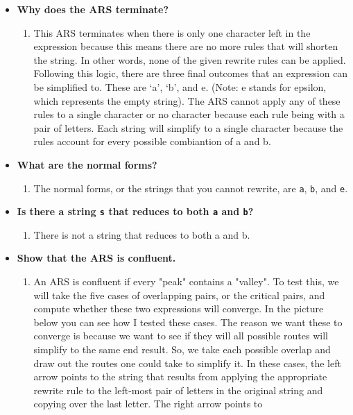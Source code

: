 \documentclass{article}
\theoremstyle{theorem}
\theoremstyle{definition}
\theoremstyle{remark}
\begin{document}
\begin{itemize}
  \item \textbf{Why does the ARS terminate?}
    \begin{enumerate} 
      \item[] This ARS terminates when there is only one character left in the expression because this means there are no more rules that will shorten the string. 
      In other words, none of the given rewrite rules can be applied. Following this logic, there are three final outcomes that an expression can be simplified to. 
      These are `a', `b', and e. (Note: e stands for epsilon, which represents the empty string). The ARS cannot apply any of these rules to a single character or no character 
      because each rule being with a pair of letters. Each string will simplify to a single character because the rules account for every possible combiantion of a and b. 
    \end{enumerate}
  \item \textbf{What are the normal forms?} 
    \begin{enumerate} 
      \item[] The normal forms, or the strings that you cannot rewrite, are \texttt{a}, \texttt{b}, and \texttt{e}.
    \end{enumerate}
  \item \textbf{Is there a string \texttt{s} that reduces to both \texttt{a} and \texttt{b}?}
    \begin{enumerate} 
      \item[] There is not a string that reduces to both a and b. 
    \end{enumerate}
  \item \textbf{Show that the ARS is confluent.}
    \begin{enumerate} 
      \item[] An ARS is confluent if every "peak" contains a "valley". To test this, we will take the five cases of overlapping pairs, or the critical pairs, and compute whether these 
      two expressions will converge. In the picture below you can see how I tested these cases. The reason we want these to converge is because we want to see if they will all possible 
      routes will simplify to the same end result. So, we take each possible overlap and draw out the routes one could take to simplify it. In these cases, the left arrow points to the 
      string that results from applying the appropriate rewrite rule to the left-most pair of letters in the original string and copying over the last letter. The right arrow points to

\end{enumerate}
\end{itemize}
\end{document}
